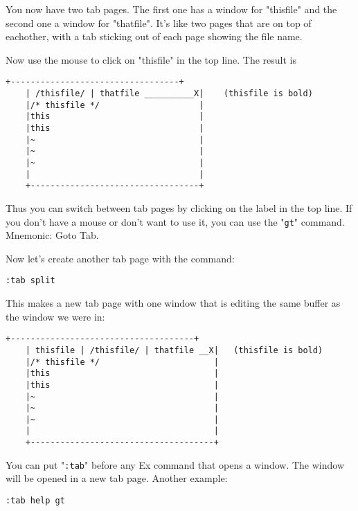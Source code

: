 You now have two tab pages.
The first one has a window for "thisfile" and the second one a window for "thatfile".
It's like two pages that are on top of eachother, with a tab sticking out of each page showing the file name.

Now use the mouse to click on "thisfile" in the top line.
The result is

		\begin{Verbatim}[samepage=true]
    +----------------------------------+
    | /thisfile/ | thatfile __________X|    (thisfile is bold)
    |/* thisfile */                    |
    |this                              |
    |this                              |
    |~                                 |
    |~                                 |
    |~                                 |
    |                                  |
    +----------------------------------+
						\end{Verbatim}

Thus you can switch between tab pages by clicking on the label in the top line.
If you don't have a mouse or don't want to use it, you can use the "\verb!gt!" command.
Mnemonic: Goto Tab.

Now let's create another tab page with the command:

 \begin{Verbatim}[samepage=true]
 :tab split
 \end{Verbatim}

This makes a new tab page with one window that is editing the same buffer as the window we were in:

\begin{Verbatim}[samepage=true]
    +-------------------------------------+
    | thisfile | /thisfile/ | thatfile __X|   (thisfile is bold)
    |/* thisfile */                       |
    |this                                 |
    |this                                 |
    |~                                    |
    |~                                    |
    |~                                    |
    |                                     |
    +-------------------------------------+
\end{Verbatim}

You can put "\verb!:tab!" before any Ex command that opens a window.
The window will be opened in a new tab page.
Another example:

 \begin{Verbatim}[samepage=true]
 :tab help gt
 \end{Verbatim}


